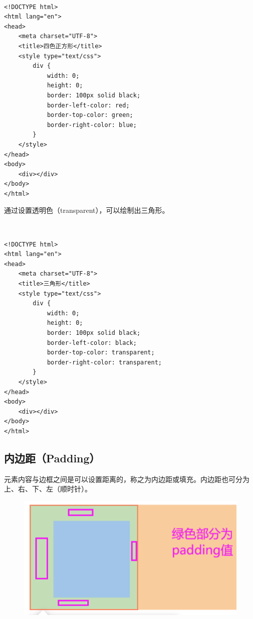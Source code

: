 \\
\begin{lstlisting}[style=htmlcssjs]
<!DOCTYPE html>
<html lang="en">
<head>
    <meta charset="UTF-8">
    <title>四色正方形</title>
    <style type="text/css">
        div {
            width: 0;
            height: 0;
            border: 100px solid black;
            border-left-color: red;
            border-top-color: green;
            border-right-color: blue;
        }
    </style>
</head>
<body>
    <div></div>
</body>
</html>
\end{lstlisting}

通过设置透明色（transparent），可以绘制出三角形。

\begin{figure}[H]
	\centering
\end{figure}

 \\
\begin{lstlisting}[style=htmlcssjs]
<!DOCTYPE html>
<html lang="en">
<head>
    <meta charset="UTF-8">
    <title>三角形</title>
    <style type="text/css">
        div {
            width: 0;
            height: 0;
            border: 100px solid black;
            border-left-color: black;
            border-top-color: transparent;
            border-right-color: transparent;
        }
    </style>
</head>
<body>
    <div></div>
</body>
</html>
\end{lstlisting}

\subsection{内边距（Padding）}

元素内容与边框之间是可以设置距离的，称之为内边距或填充。内边距也可分为上、右、下、左（顺时针）。

\begin{figure}[H]
	\centering
	\includegraphics[scale=0.7]{img/C8/8-2/3.png}
\end{figure}

